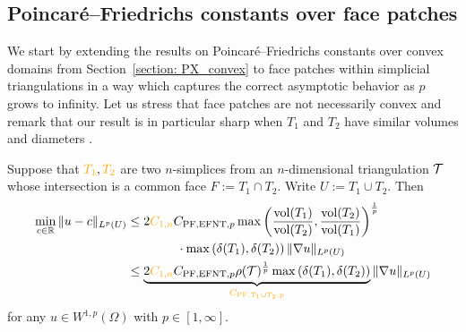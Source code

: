 \documentclass[10pt,letterpaper]{article}
\newcommand\cye[1]{%
  \protect\leavevmode
  \begingroup
    \color{red!35!yellow}%
    #1%
  \endgroup
}
\begin{document}

\subsection{\cye{Poincar\'e--Friedrichs constants over face patches}}

\cye{We start by extending the results on Poincar\'e--Friedrichs constants over convex domains from Section~\ref{section: PX_convex} to face patches within simplicial triangulations} in a way which captures the correct asymptotic behavior as $p$ grows to infinity. \cye{Let us stress that face patches are not necessarily convex and remark that our result is in particular sharp when $T_1$ and $T_2$ have similar volumes and diameters}.

\begin{lemma}\label{lemma:poincarefriedrichsoverfacepatch}
    Suppose that $\cye{T_1}, \cye{T_2}$ are two $n$-simplices \cye{from an $n$-dimensional triangulation ${\mathcal T}$} whose intersection is a common face $F := T_1 \cap T_2$. 
    Write $U := T_1 \cup T_2$. 
    Then 
    \begin{align*}
        \min\limits_{ c \in \bbR }
        \| u - c \|_{L^{p}(U)}
        &
        \leq 
        2 \cye{\Ceins{n}} C_{\PF,{\rm EFNT},p}
        \max\left( 
            \frac{ \vol(T_1) }{ \vol(T_2) }
            ,
            \frac{ \vol(T_2) }{ \vol(T_1) }
        \right)^{\frac 1 p}
        \\&\qquad\qquad 
        \cdot 
        \max\left( \diam(T_1), \diam(T_2) \right)
        \| \nabla u \|_{L^{p}(U)}
        \\&
        \leq \underbrace{
        2 \cye{\Ceins{n}} C_{\PF,{\rm EFNT},p}
        \rho(\calT)^{\frac 1 p}
        \max\left( \diam(T_1), \diam(T_2) \right)}_{\cye{C_{{\rm{PF}},T_1 \cup T_2,p}}}
        \| \nabla u \|_{L^{p}(U)}
    \end{align*}
    for any $u \in W^{1,p}(\Omega)$ with $p \in [1,\infty]$.
\end{lemma}
\end{document}
